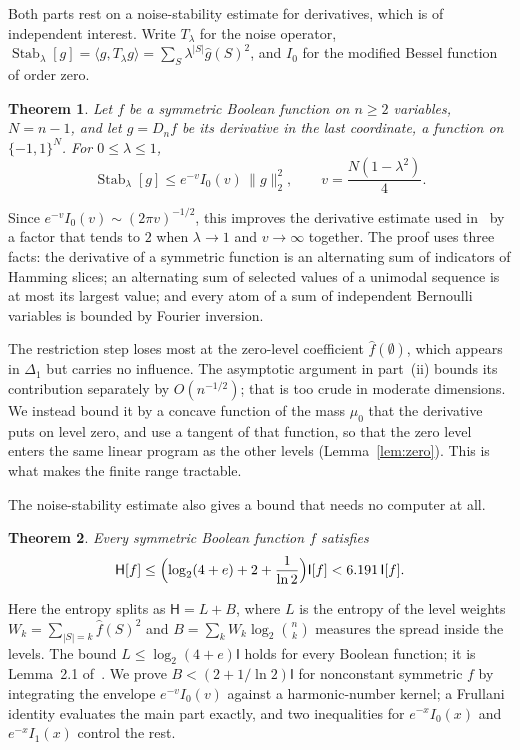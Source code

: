 \documentclass[11pt]{amsart}
\newtheorem{mainthm}{Theorem}
\theoremstyle{definition}
\theoremstyle{remark}
\newcommand{\bits}{\{-1,1\}}
\newcommand{\HH}{\mathsf H}
\newcommand{\I}{\mathsf I}
\newcommand{\wh}[1]{\widehat{#1}}
\DeclareMathOperator{\Stab}{Stab}
\begin{document}
Both parts rest on a noise-stability estimate for derivatives, which is of independent interest. Write $T_\lambda$ for the noise operator, $\Stab_\lambda[g]=\langle g,T_\lambda g\rangle=\sum_S\lambda^{|S|}\wh g(S)^2$, and $I_0$ for the modified Bessel function of order zero.

\begin{mainthm}\label{thm:stab}
Let $f$ be a symmetric Boolean function on $n\ge2$ variables, $N=n-1$, and let $g=D_nf$ be its derivative in the last coordinate, a function on $\bits^N$. For $0\le\lambda\le1$,
\[
 \Stab_\lambda[g]\le e^{-v}I_0(v)\,\|g\|_2^2,\qquad v=\frac{N(1-\lambda^2)}{4}.
\]
\end{mainthm}

Since $e^{-v}I_0(v)\sim(2\pi v)^{-1/2}$, this improves the derivative estimate used in~\cite{OWZ11} by a factor that tends to $2$ when $\lambda\to1$ and $v\to\infty$ together. The proof uses three facts: the derivative of a symmetric function is an alternating sum of indicators of Hamming slices; an alternating sum of selected values of a unimodal sequence is at most its largest value; and every atom of a sum of independent Bernoulli variables is bounded by Fourier inversion.

The restriction step loses most at the zero-level coefficient $\wh f(\emptyset)$, which appears in $\Delta_1$ but carries no influence. The asymptotic argument in part~(ii) bounds its contribution separately by $O(n^{-1/2})$; that is too crude in moderate dimensions. We instead bound it by a concave function of the mass $\mu_0$ that the derivative puts on level zero, and use a tangent of that function, so that the zero level enters the same linear program as the other levels (Lemma~\ref{lem:zero}). This is what makes the finite range tractable.

The noise-stability estimate also gives a bound that needs no computer at all.

\begin{mainthm}\label{thm:analytic}
Every symmetric Boolean function $f$ satisfies
\[
 \HH[f]\le\Bigl(\log_2(4+e)+2+\frac1{\ln2}\Bigr)\I[f]<6.191\,\I[f].
\]
\end{mainthm}

Here the entropy splits as $\HH=L+B$, where $L$ is the entropy of the level weights $W_k=\sum_{|S|=k}\wh f(S)^2$ and $B=\sum_kW_k\log_2\binom nk$ measures the spread inside the levels. The bound $L\le\log_2(4+e)\I$ holds for every Boolean function; it is Lemma~2.1 of~\cite{Shm26}. We prove $B<(2+1/\ln2)\I$ for nonconstant symmetric $f$ by integrating the envelope $e^{-v}I_0(v)$ against a harmonic-number kernel; a Frullani identity evaluates the main part exactly, and two inequalities for $e^{-x}I_0(x)$ and $e^{-x}I_1(x)$ control the rest.
\end{document}
